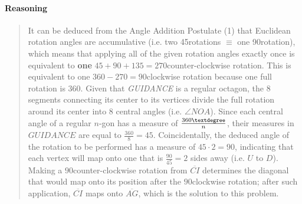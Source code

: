 \documentclass[letterpaper,12pt,twoside]{report}
\begin{document}
	\paragraph{Reasoning}
	\begin{quotation}
	
	It can be deduced from the Angle Addition Postulate (1) that Euclidean rotation angles are accumulative (i.e. two 45\textdegree \space rotations $\equiv$ one 90\textdegree \space rotation), which means that applying all of the given rotation angles exactly once is equivalent to \textbf{one} $45+90+135=270$\textdegree \space counter-clockwise rotation. This is equivalent to one $360-270=90$\textdegree \space clockwise rotation because one full rotation is $360$\textdegree. Given that \textit{GUIDANCE} is a regular octagon, the 8 segments connecting its center to its vertices divide the full rotation around its center into 8 central angles (i.e. $\angle NOA$). Since each central angle of a regular $n$-gon has a measure of $\frac{360\textdegree}{n}$, their measures in $GUIDANCE$ are equal to $\frac{360}{8}=45$\textdegree. Coincidentally, the deduced angle of the rotation to be performed has a measure of $45\cdot2=90$\textdegree, indicating that each vertex will map onto one that is $\frac{90}{45}=2$ sides away (i.e. $U$ to $D$). Making a $90$\textdegree \space counter-clockwise rotation from $\overline{CI}$ determines the  diagonal that would map onto its position after the $90$\textdegree \space clockwise rotation; after such application, $\overline{CI}$ maps onto $\boxed{\overline{AG}}$, which is the solution to this problem.
	
	\end{quotation}
	
	\iffalse
	
	\paragraph{External References}
	
	\begin{enumerate}
		\item Textbook Ch. 9, Pg. 589: Area of Parallelograms
		\item Textbook Ch. 9, Pg. 590: Area of Triangles and Trapezoids
	\end{enumerate}
	\fi
\end{document}
